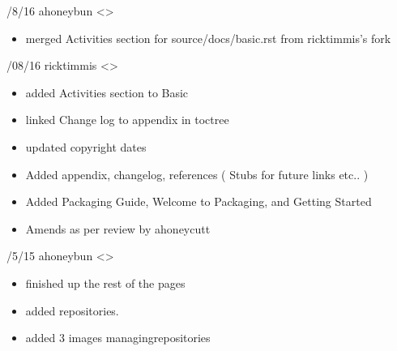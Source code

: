 \documentclass[letterpaper,10pt,english]{sphinxmanual}
\begin{document}
/8/16 \sphinxhyphen{} ahoneybun \textless{}\textgreater{}
\begin{itemize}
\item {} 
\sphinxAtStartPar
merged Activities section for source/docs/basic.rst from ricktimmis’s fork

\end{itemize}

/08/16 \sphinxhyphen{} ricktimmis \textless{}\textgreater{}
\begin{itemize}
\item {} 
\sphinxAtStartPar
added Activities section to Basic

\item {} 
\sphinxAtStartPar
linked Change log to appendix in toctree

\item {} 
\sphinxAtStartPar
updated copyright dates

\item {} 
\sphinxAtStartPar
Added appendix, changelog, references ( Stubs for future links etc.. )

\item {} 
\sphinxAtStartPar
Added Packaging Guide, Welcome to Packaging, and Getting Started

\item {} 
\sphinxAtStartPar
Amends as per review by ahoneycutt

\end{itemize}

/5/15 \sphinxhyphen{} ahoneybun \textless{}\textgreater{}
\begin{itemize}
\item {} 
\sphinxAtStartPar
finished up the rest of the pages

\item {} 
\sphinxAtStartPar
added repositories.

\item {} 
\sphinxAtStartPar
added 3 images managing\sphinxhyphen{}repositories

\end{itemize}
\end{document}
